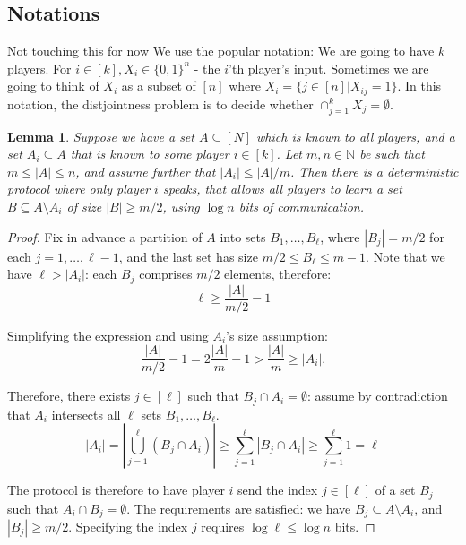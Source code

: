\documentclass{article}
\newcommand{\nat}{\mathbb{N}}
\newcommand{\Rnote}[1]{ { \color{magenta} #1 } }
\theoremstyle{plain}
\newtheorem{lemma}[theorem]{Lemma}
\begin{document}
\subsection{Notations}
\Rnote{Not touching this for now}
We use the popular notation: We are going to have $k$ players. For $i \in [k], X_i \in \{0,1\}^{n}$ - the $i$'th player's input. Sometimes we are going to think of $X_i$ as a subset of $[n]$ where $X_i = \{j \in [n] | X_{ij} = 1\}$. In this notation, the distjointness problem is to decide whether $\cap^{k}_{j=1}X_j = \emptyset$. \newline

\begin{lemma}
  Suppose we have a set $A \subseteq [N]$ which is known to all players, and a set $A_i \subseteq A$ that is known to some player $i \in [k]$.
  Let $m, n \in \nat$ be such that $m \leq |A| \leq n$, and assume further that $|A_i| \leq |A|/m$.
  Then there is a deterministic protocol where only player $i$ speaks,
  that allows all players to learn a set $B \subseteq A \setminus A_i$
  of size $|B| \geq m/2$,
  using $\log n$ bits of communication.
  \label{lemma:reveal_zeroes}
\end{lemma}
\begin{proof}
  Fix in advance a partition of $A$ into sets $B_1,\ldots,B_{\ell}$,
  where $|B_j| = m/2$ for each $j = 1,\ldots,\ell-1$,
  and the last set has size $m/2 \leq B_{\ell} \leq m - 1$.
  Note that we have $\ell > |A_i|$: \newline
  each $B_j$ comprises $m/2$ elements, therefore:
  \begin{equation*}
    \ell \geq \frac{|A|}{m/2} - 1
  \end{equation*}
  
  Simplifying the expression and using $A_i$'s size assumption:
  \begin{equation*}
    \frac{|A|}{m/2} - 1 =  2\frac{|A|}{m} - 1 > \frac{|A|}{m} \geq |A_i|.
  \end{equation*}
   
  
  Therefore, there exists $j \in [\ell]$ such that $B_j \cap A_i = \emptyset$:
  assume by contradiction that $A_i$ intersects all $\ell$ sets $B_1,\ldots,B_{\ell}$. 
  \begin{equation*}
  |A_i| = |\bigcup_{j=1}^{\ell}\left(B_j \cap A_i \right)| \geq \sum_{j=1}^{\ell} |B_j \cap A_i| \geq \sum_{j=1}^{\ell}1 = \ell
  \end{equation*}

  The protocol is therefore to have player $i$ send the index $j \in [\ell]$ of a set $B_j$
  such that $A_i \cap B_j = \emptyset$.
  The requirements are satisfied: we have $B_j \subseteq A \setminus A_i$,
  and $|B_j| \geq m / 2$.
  Specifying the index $j$ requires $\log \ell \leq \log n$ bits.
  
\end{proof}
\end{document}
